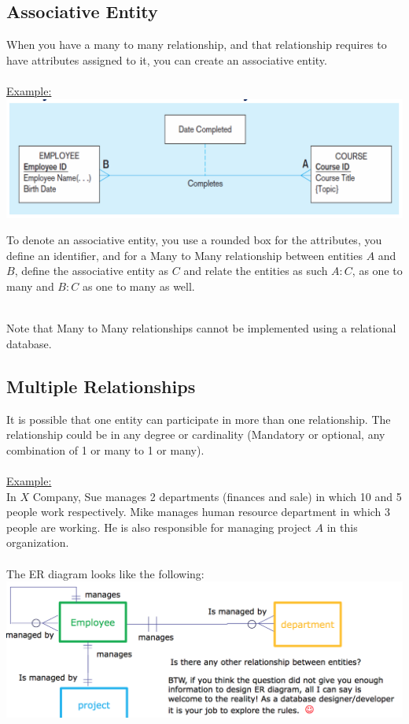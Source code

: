 \documentclass[12pt]{article}
\begin{document}
\subsection{Associative Entity}

When you have a many to many relationship, and that relationship requires to have attributes assigned to it, you can create an associative entity.\\
\\
\underline{Example:}\\
\includegraphics[scale=0.5]{lec3-1}

To denote an associative entity, you use a rounded box for the attributes, you define an identifier, and for a Many to Many relationship between entities $A$ and $B$, define the associative entity as $C$ and relate the entities as such $A:C$, as one to many and $B:C$ as one to many as well.\\
\\
\begin{tcolorbox}
	Note that Many to Many relationships cannot be implemented using a relational database.
\end{tcolorbox}

\subsection{Multiple Relationships}

It is possible that one entity can participate in more than one relationship. The relationship could be in any degree or cardinality (Mandatory or optional, any combination of 1 or many to 1 or many).\\
\\
\underline{Example:}\\
In $X$ Company, Sue manages 2 departments (finances and sale) in which 10 and 5 people work respectively. Mike manages human resource department in which 3 people are working. He is also responsible for managing project $A$ in this organization.\\
\\
The ER diagram looks like the following:\\
\includegraphics[scale=0.5]{lec3-2}
\end{document}
